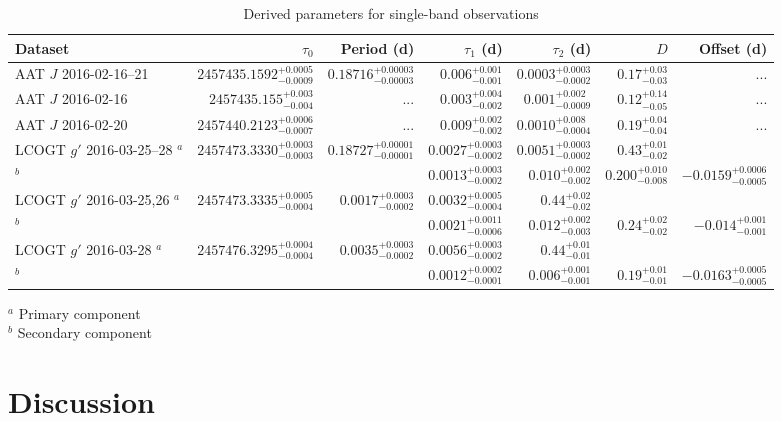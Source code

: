 \documentclass[apj]{emulateapj}
\begin{document}
\begin{table}
    \caption{Derived parameters for single-band observations}
    \label{tab:single_obs}
    \centering
    \begin{tabular}{lrrrrrr}
    \hline\hline
        Dataset & $\tau_0$ & Period (d) & $\tau_1$ (d) & $\tau_2$ (d) & $D$ & Offset (d) \\
    \hline
        AAT $J$ 2016-02-16--21 & $2457435.1592_{-0.0009}^{+0.0005}$ & $0.18716_{-0.00003}^{+0.00003}$ & $0.006_{-0.001}^{+0.001}$ & $0.0003_{-0.0002}^{+0.0003}$ & $0.17_{-0.03}^{+0.03}$ & ... \\
        AAT $J$ 2016-02-16 & $2457435.155_{-0.004}^{+0.003}$ & ... & $0.003_{-0.002}^{+0.004}$ & $0.001_{-0.0009}^{+0.002}$ & $0.12_{-0.05}^{+0.14}$ & ...\\
        AAT $J$ 2016-02-20 & $2457440.2123_{-0.0007}^{+0.0006}$ & ... & $0.009_{-0.002}^{+0.002}$ & $0.0010_{-0.0004}^{+0.008}$ & $0.19_{-0.04}^{+0.04}$ & ...\\
        LCOGT $g'$ 2016-03-25--28 $^a$& $2457473.3330_{-0.0003}^{+0.0003}$ & $0.18727_{-0.00001}^{+0.00001}$ & $0.0027_{-0.0002}^{+0.0003}$ & $0.0051_{-0.0002}^{+0.0003}$ & $0.43_{-0.02}^{+0.01}$ & \\
        $^b$&&& $0.0013_{-0.0002}^{+0.0003}$ & $0.010_{-0.002}^{+0.002}$ & $0.200_{-0.008}^{+0.010}$ & $-0.0159_{-0.0005}^{+0.0006}$\\ 
        LCOGT $g'$ 2016-03-25,26 $^a$ & $2457473.3335_{-0.0004}^{+0.0005}$ & $0.0017_{-0.0002}^{+0.0003}$ & $0.0032_{-0.0004}^{+0.0005}$ & $0.44_{-0.02}^{+0.02}$ & \\
        $^b$ &&& $0.0021_{-0.0006}^{+0.0011}$ & $0.012_{-0.003}^{+0.002}$ & $0.24_{-0.02}^{+0.02}$ & $-0.014_{-0.001}^{+0.001}$\\ 
        LCOGT $g'$ 2016-03-28 $^a$& $2457476.3295_{-0.0004}^{+0.0004}$ & $0.0035_{-0.0002}^{+0.0003}$ & $0.0056_{-0.0002}^{+0.0003}$ & $0.44_{-0.01}^{+0.01}$ & \\
        $^b$ &&& $0.0012_{-0.0001}^{+0.0002}$ & $0.006_{-0.001}^{+0.001}$ & $0.19_{-0.01}^{+0.01}$ & $-0.0163_{-0.0005}^{+0.0005}$\\         
    \hline
    \end{tabular}
    \begin{flushleft}
    $^a$ Primary component\\
    $^b$ Secondary component
    \end{flushleft}
\end{table}

\section{Discussion}
\label{sec:discussion}
\end{document}
